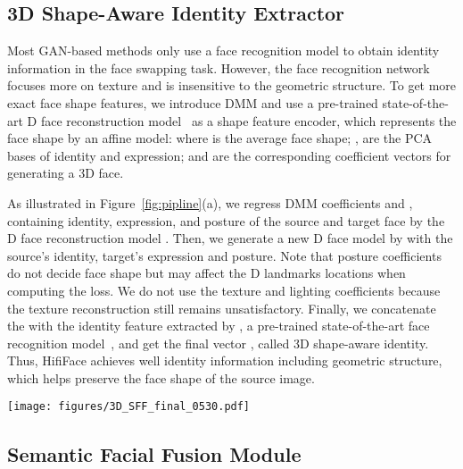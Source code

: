 \documentclass{article}
\begin{document}
\subsection{3D Shape-Aware Identity Extractor}\label{sec:sid}
Most GAN-based methods only use a face recognition model to obtain identity information in the face swapping task. However, the face recognition network focuses more on texture and is insensitive to the geometric structure.
To get more exact face shape features, we introduce DMM and use a pre-trained state-of-the-art D face reconstruction model~\cite{deng2019accurate} as a shape feature encoder, which represents the face shape  by an affine model:
where  is the average face shape; ,  are the PCA bases of identity and expression; {} and {} are the corresponding coefficient vectors for generating a 3D face.

As illustrated in Figure~\ref{fig:pipline}(a), we regress DMM coefficients  and , containing identity, expression, and posture of the source and target face by the D face reconstruction model . 
Then, we generate a new D face model by  with the source's identity, target's expression and posture.
Note that posture coefficients do not decide face shape but may affect the D landmarks locations when computing the loss. 
We do not use the texture and lighting coefficients because the texture reconstruction still remains unsatisfactory. 
Finally, we concatenate the  with the identity feature  extracted by , a pre-trained state-of-the-art face recognition model~\cite{huang2020curricularface}, and get the final vector , called 3D shape-aware identity. 
Thus, HifiFace achieves well identity information including geometric structure, which helps preserve the face shape of the source image.


\begin{figure*}[t] 
\begin{center} 
\texttt{[image: figures/3D\_SFF\_final\_0530.pdf]} 
\end{center} 
\vspace{-3mm}
\caption{Details of D shape-aware identity extractor and SFF module. 
(a) D shape-aware identity extractor uses  (D face reconstruction network) and  (face recognition network) to generate shape-aware identity. 
(b) SFF module recombines the encoder and decoder feature by  and makes the final blending by . The  means the upsample Module.} 
\label{fig:pipline} 
\end{figure*}


\subsection{Semantic Facial Fusion Module}\label{sec:sff}
\end{document}
